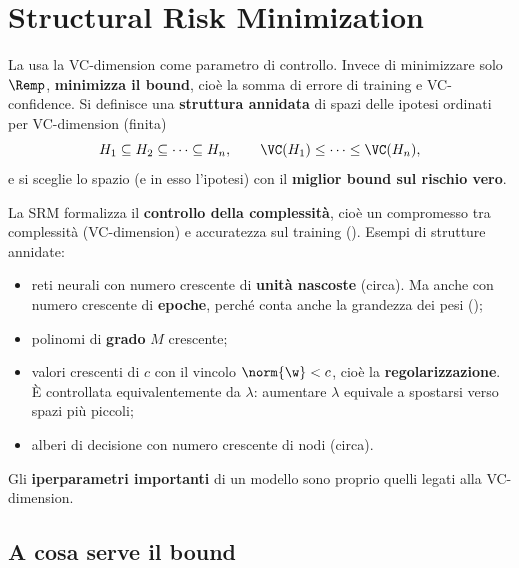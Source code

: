 \section{Structural Risk Minimization}
\label{sec:srm}

\begin{definizione}
La  usa la VC-dimension come parametro di controllo. Invece di minimizzare solo $\Remp$,
\textbf{minimizza il bound}, cioè la somma di errore di training e VC-confidence. Si definisce una
\textbf{struttura annidata} di spazi delle ipotesi ordinati per VC-dimension (finita)
\[
H_1\subseteq H_2\subseteq\dots\subseteq H_n,\qquad \VC(H_1)\le\dots\le\VC(H_n),
\]
e si sceglie lo spazio (e in esso l'ipotesi) con il \textbf{miglior bound sul rischio vero}.
\end{definizione}

La SRM formalizza il \textbf{controllo della complessità}, cioè un compromesso tra complessità (VC-dimension) e
accuratezza sul training (). Esempi di strutture annidate:
\begin{itemize}
  \item reti neurali con numero crescente di \textbf{unità nascoste} (circa). Ma anche con numero crescente di
        \textbf{epoche}, perché conta anche la grandezza dei pesi ();
  \item polinomi di \textbf{grado} $M$ crescente;
  \item valori crescenti di $c$ con il vincolo $\norm{\w}<c$, cioè la \textbf{regolarizzazione}. È controllata
        equivalentemente da $\lambda$: aumentare $\lambda$ equivale a spostarsi verso spazi più piccoli;
  \item alberi di decisione con numero crescente di nodi (circa).
\end{itemize}
Gli \textbf{iperparametri importanti} di un modello sono proprio quelli legati alla VC-dimension.

\subsection{A cosa serve il bound}

